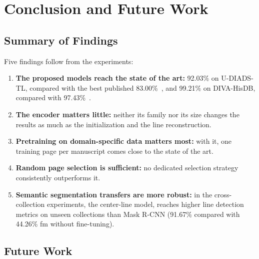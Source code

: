 \chapter{Conclusion and Future Work}
\label{ch:conclusions}

\section{Summary of Findings}
\label{sec:conclusions}

Five findings follow from the experiments:
\begin{enumerate}
    \item \textbf{The proposed models reach the state of the art:} 92.03\% on U-DIADS-TL, compared with the best published 83.00\%~\cite{Zottin_2025_FEST}, and 99.21\% on DIVA-HisDB, compared with 97.43\%~\cite{signals3030032}.
    \item \textbf{The encoder matters little:} neither its family nor its size changes the results as much as the initialization and the line reconstruction.
    \item \textbf{Pretraining on domain-specific data matters most:} with it, one training page per manuscript comes close to the state of the art.
    \item \textbf{Random page selection is sufficient:} no dedicated selection strategy consistently outperforms it.
    \item \textbf{Semantic segmentation transfers are more robust:} in the cross-collection experiments, the center-line model, reaches higher line detection metrics on unseen collections than Mask R-CNN (91.67\% compared with 44.26\% \gls{fm} without fine-tuning).
\end{enumerate}

\section{Future Work}
\label{sec:future-work}

